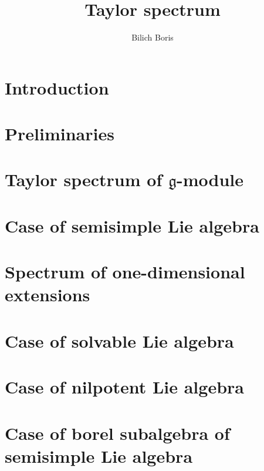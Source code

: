 \documentclass[letterpaper]{amsart}
\author{Bilich Boris}
\title{Taylor spectrum}
\newcommand{\lieg}{\mathfrak{g}}
\begin{document}
\maketitle
\section{Introduction}%
\label{sec:introduction}


\section{Preliminaries}%
\label{sec:preliminaries}


\section{Taylor spectrum of $\lieg$-module}%
\label{sec:spectrumofmodule}


\section{Case of semisimple Lie algebra}%
\label{sec:semisimple}


\section{Spectrum of one-dimensional extensions}%
\label{sec:1extensions}


\section{Case of solvable Lie algebra}%
\label{sec:solvable}


\section{Case of nilpotent Lie algebra}
\label{sec:nilpotent}


\section{Case of borel subalgebra of semisimple Lie algebra}
\label{sec:borel}

\end{document}
